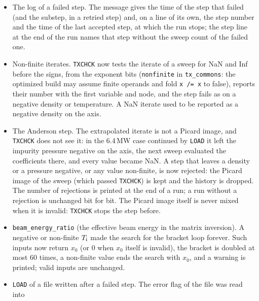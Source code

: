 \documentclass[11pt]{article}
\def\r#1{{\rm#1}}
\begin{document}
\begin{itemize}
  time discretization.  \texttt{ADV} = 0.9 and 0.95 ran 500 steps (0.05\,s) in those cases with NBI,
  with at most two steps not converged at $\Delta t/2$; their stability over longer runs is not
  verified.  \texttt{ADV} = 1 (fully implicit) is the recommended value for the theta scheme, and BDF2
  remains the default.  The comment of \texttt{ADV} in \texttt{txinit.f90} no longer lists 2/3
  (Galerkin), 0.729 (an empirical lower limit of an older code) and 0.878 (Liniger).
\item The log of a failed step.  The message gives the time of the step that failed (and the
  substep, in a retried step) and, on a line of its own, the step number and the time of the last
  accepted step, at which the run stops; the step line at the end of the run names that step without
  the sweep count of the failed one.
\item Non-finite iterates.  \texttt{TXCHCK} now tests the iterate of a sweep for NaN and Inf before
  the signs, from the exponent bits (\texttt{nonfinite} in \texttt{tx\_commons}: the optimized build
  may assume finite operands and fold \texttt{x /= x} to false), reports their number with the first
  variable and node, and the step fails as on a negative density or temperature.  A NaN iterate
  used to be reported as a negative density on the axis.
\item The Anderson step.  The extrapolated iterate is not a Picard image, and \texttt{TXCHCK} does
  not see it: in the 6.4\,MW case continued by \texttt{LOAD} it left the impurity pressure negative on
  the axis, the next sweep evaluated the coefficients there, and every value became NaN.  A step
  that leaves a density or a pressure negative, or any value non-finite, is now rejected: the
  Picard image of the sweep (which passed \texttt{TXCHCK}) is kept and the history is dropped.  The
  number of rejections is printed at the end of a run; a run without a rejection is unchanged bit
  for bit.  The Picard image itself is never mixed when it is invalid: \texttt{TXCHCK} stops the
  step before.
\item \texttt{beam\_energy\_ratio} (the effective beam energy in the matrix inversion).  A negative
  or non-finite $T_\r{i}$ made the search for the bracket loop forever.  Such inputs now return
  $x_0$ (or 0 when $x_0$ itself is invalid), the bracket is doubled at most 60 times, a non-finite
  value ends the search with $x_0$, and a warning is printed; valid inputs are unchanged.
\item \texttt{LOAD} of a file written after a failed step.  The error flag of the file was read into

\end{itemize}
\end{document}
